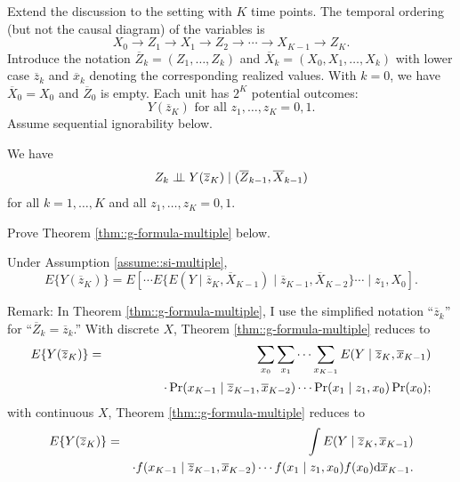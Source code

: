 \begin{HomeworkProblem}\label{exr:29-7}



Extend the discussion to the setting with $K$ time points. The temporal ordering (but not the causal diagram) of the variables is
\[
X_0 \rightarrow Z_1 \rightarrow X_1 \rightarrow Z_2 \rightarrow \cdots  \rightarrow  X_{K-1}  \rightarrow Z_K .
\]
Introduce the notation $\overline{Z}_k = (Z_1, \ldots, Z_k)$ and $\overline{X}_k = (X_0, X_1, \ldots, X_k)$ with lower case $\overline{z}_k $ and $\overline{x}_k$  denoting the corresponding  realized values. With $k=0$, we have $\overline{X}_0 = X_0$ and $\overline{Z}_0$ is empty.
Each unit has $2^K$ potential outcomes:
\[
Y(\overline{z}_K) \text{ for all } z_1,\ldots, z_K = 0,1.
\]
Assume sequential ignorability below.

\begin{assumption}
\label{assume::si-multiple}
We have
\[
Z_k \mathrel{\perp\!\!\!\perp} Y(\overline{z}_K) \mid (\overline{Z}_{k-1}, \overline{X}_{k-1})
\]
for all $k=1,\ldots, K$ and all $z_1,\ldots, z_K = 0,1.$
\end{assumption}


Prove Theorem \ref{thm::g-formula-multiple} below.


\begin{Theorem}
\label{thm::g-formula-multiple}
Under Assumption \ref{assume::si-multiple},
\[
E\{ Y(\overline{z}_K)  \} = E\left[ \cdots
E\{   E(Y\mid \overline{z}_K, \overline{X}_{K-1}) \mid \overline{z}_{K-1}, \overline{X}_{K-2} \}
\cdots \mid z_1,  X_0 \right] .
\]
\end{Theorem}


Remark:
In Theorem \ref{thm::g-formula-multiple}, I use the simplified notation ``$\overline{z}_k$'' for  ``$\overline{Z}_k = \overline{z}_k $.''
With discrete $X$, Theorem \ref{thm::g-formula-multiple} reduces to
\begin{eqnarray*}
 E\{ Y(\overline{z}_K)  \}
&=&
\sum_{x_0} \sum_{x_1} \cdots   \sum_{x_{K-1}}
 E(Y\mid \overline{z}_K, \overline{x}_{K-1})   \\
 &&
\qquad \qquad \cdot  \operatorname{Pr}(x_{K-1}\mid \overline{z}_{K-1}, \overline{x}_{K-2})
 \cdots
 \operatorname{Pr}(x_1\mid z_{1}, x_0)
 \operatorname{Pr}(x_0) ;
\end{eqnarray*}
with continuous $X$, Theorem \ref{thm::g-formula-multiple} reduces to
\begin{eqnarray*}
  E\{ Y(\overline{z}_K)  \}
&=&
\int
 E(Y\mid \overline{z}_K, \overline{x}_{K-1})   \\
 && \cdot
 f(x_{K-1}\mid \overline{z}_{K-1}, \overline{x}_{K-2})
 \cdots
 f(x_1\mid z_{1}, x_0)
 f(x_0)
 \textnormal{d} \overline{x}_{K-1}   .
\end{eqnarray*}






\end{HomeworkProblem}

